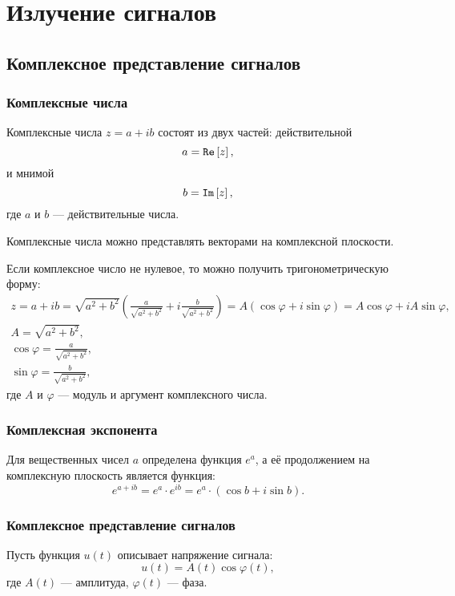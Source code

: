 \chapter{Излучение сигналов}


\section{Комплексное представление сигналов}

\subsection{Комплексные числа}

Комплексные числа $z = a + i b$ состоят из двух частей: действительной
\[
    a = \mathtt{Re} \left [ z \right ],
\]
и мнимой
\[
    b = \mathtt{Im} \left [ z \right ],
\]
где $a$ и $b$ --- действительные числа.

Комплексные числа можно представлять векторами на комплексной плоскости.

Если комплексное число не нулевое, то можно получить тригонометрическую форму:
\begin{gather*}
    z
    = a + i b
    = \sqrt{a^2 + b^2} \left ( \frac{a}{\sqrt{a^2 + b^2}} + i \frac{b}{\sqrt{a^2 + b^2}} \right )
    = A \left ( \cos \varphi + i \sin \varphi \right )
    = A \cos \varphi + i A \sin \varphi , \\
    A = \sqrt{a^2 + b^2} , \\
    \cos \varphi = \frac{a}{\sqrt{a^2 + b^2}} , \\
    \sin \varphi = \frac{b}{\sqrt{a^2 + b^2}} ,
\end{gather*}
где $A$ и $\varphi$ --- модуль и аргумент комплексного числа.


\subsection{Комплексная экспонента}

Для вещественных чисел $a$ определена функция $e^a$, а её продолжением на комплексную плоскость является функция:
\[
    e^{a + i b}
    = e^a \cdot e^{i b}
    = e^a \cdot \left ( \cos b + i \sin b \right ).
\]


\subsection{Комплексное представление сигналов}

Пусть функция $u(t)$ описывает напряжение сигнала:
\[
    u(t) = A(t) \cos \varphi(t) ,
\]
где $A(t)$ --- амплитуда, $\varphi(t)$ --- фаза.

